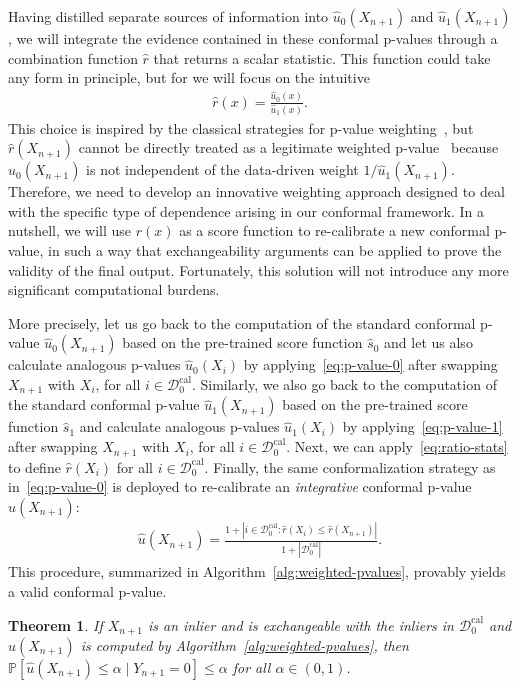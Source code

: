 \documentclass[11pt]{article}
\newtheorem{theorem}{Theorem}
\renewcommand{\P}[1]{\mathbb{P}\left[#1\right]}
\begin{document}
Having distilled separate sources of information into $\hat{u}_0(X_{n+1})$ and $\hat{u}_1(X_{n+1})$, we will integrate the evidence contained in these conformal p-values through a combination function $\hat{r}$ that returns a scalar statistic.
This function could take any form in principle, but for we will focus on the intuitive
\begin{align} \label{eq:ratio-stats}
  \hat{r}(x) = \frac{\hat{u}_0(x)}{\hat{u}_1(x)}.
\end{align}
This choice is inspired by the classical strategies for p-value weighting~\cite{genovese2006false,hu2010false}, but $\hat{r}(X_{n+1})$ cannot be directly treated as a legitimate weighted p-value~\cite{ignatiadis2021covariate} because $\hat{u}_0(X_{n+1})$ is not independent of the data-driven weight $1/\hat{u}_1(X_{n+1})$.
Therefore, we need to develop an innovative weighting approach designed to deal with the specific type of dependence arising in our conformal framework.
In a nutshell, we will use $r(x)$ as a score function to re-calibrate a new conformal p-value, in such a way that exchangeability arguments can be applied to prove the validity of the final output. Fortunately, this solution will not introduce any more significant computational burdens.

More precisely, let us go back to the computation of the standard conformal p-value $\hat{u}_0(X_{n+1})$ based on the pre-trained score function $\hat{s}_0$ and let us also calculate analogous p-values $\hat{u}_0(X_{i})$ by applying~\eqref{eq:p-value-0} after swapping $X_{n+1}$ with $X_i$, for all $i \in \mathcal{D}_0^{\mathrm{cal}}$.
Similarly, we also go back to the computation of the standard conformal p-value $\hat{u}_1(X_{n+1})$ based on the pre-trained score function $\hat{s}_1$ and calculate analogous p-values $\hat{u}_1(X_{i})$ by applying~\eqref{eq:p-value-1} after swapping $X_{n+1}$ with $X_i$, for all $i \in \mathcal{D}_0^{\mathrm{cal}}$.
Next, we can apply~\eqref{eq:ratio-stats} to define $\hat{r}(X_i)$ for all $i \in \mathcal{D}_0^{\mathrm{cal}}$.
Finally, the same conformalization strategy as in~\eqref{eq:p-value-0} is deployed to re-calibrate an {\em integrative} conformal p-value $\hat{u}(X_{n+1})$:
\begin{align} \label{eq:p-value-ratio}
  \hat{u}(X_{n+1}) = \frac{1 + |i\in \mathcal{D}_{0}^{\mathrm{cal}} : \hat{r}(X_i) \leq \hat{r}(X_{n+1})|}{1+|\mathcal{D}_{0}^{\mathrm{cal}}|}.
\end{align}
This procedure, summarized in Algorithm~\ref{alg:weighted-pvalues}, provably yields a valid conformal p-value.
\begin{theorem} \label{theorem:ratio-exchangeable}
  If $X_{n+1}$ is an inlier and is exchangeable with the inliers in $\mathcal{D}_0^{\mathrm{cal}}$ and $\hat{u}(X_{n+1})$ is computed by Algorithm~\ref{alg:weighted-pvalues}, then $\P{\hat{u}(X_{n+1}) \leq \alpha \mid Y_{n+1} = 0} \leq \alpha$ for all $\alpha \in (0,1)$.
\end{theorem}
\end{document}
